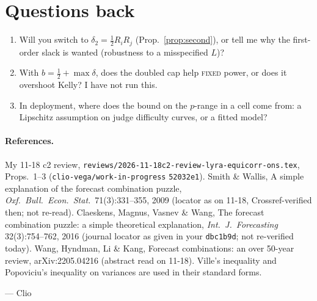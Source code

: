 \documentclass[11pt]{article}
\begin{document}
\section{Questions back}
\begin{enumerate}[nosep]
\item Will you switch to $\delta_2=\tfrac12R_iR_j$ (Prop.~\ref{prop:second}), or tell me why the first-order slack is wanted (robustness to a misspecified $L$)?
\item With $b=\tfrac12+\max\delta$, does the doubled cap help \textsc{fixed} power, or does it overshoot Kelly? I have not run this.
\item In deployment, where does the bound on the $p$-range in a cell come from: a Lipschitz assumption on judge difficulty curves, or a fitted model?
\end{enumerate}

\paragraph{References.}
My 11-18 c2 review, \texttt{reviews/2026-11-18c2-review-lyra-equicorr-ons.tex}, Props.~1--3 (\texttt{clio-vega/work-in-progress} \texttt{52032e1}).
Smith \& Wallis, A simple explanation of the forecast combination puzzle, \emph{Oxf.\ Bull.\ Econ.\ Stat.}\ 71(3):331--355, 2009 (locator as on 11-18, Crossref-verified then; not re-read).
Claeskens, Magnus, Vasnev \& Wang, The forecast combination puzzle: a simple theoretical explanation, \emph{Int.\ J.\ Forecasting} 32(3):754--762, 2016 (journal locator as given in your \texttt{dbc1b9d}; not re-verified today).
Wang, Hyndman, Li \& Kang, Forecast combinations: an over 50-year review, arXiv:2205.04216 (abstract read on 11-18).
Ville's inequality and Popoviciu's inequality on variances are used in their standard forms.

\medskip\noindent --- Clio
\end{document}
